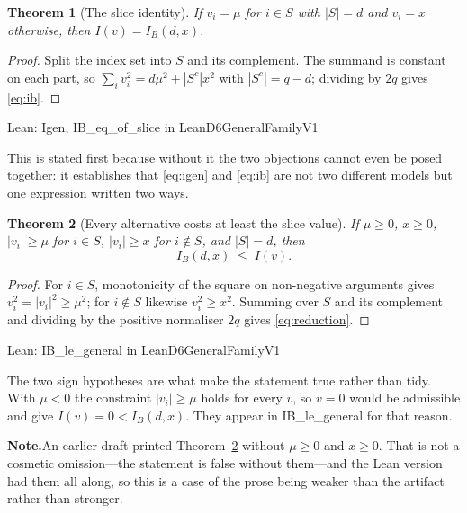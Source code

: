 \documentclass[conference]{IEEEtran}
\newtheorem{theorem}{Theorem}
\theoremstyle{definition}
\newcommand{\lean}[1]{\textsf{\footnotesize #1}}
\newcommand{\leanbox}[1]{%
  \par\vspace{2pt}\noindent
  {\footnotesize\textsf{Lean: #1}}\par\vspace{2pt}}
\newif\ifshownotes\shownotestrue
\newcommand{\NOTEPAR}[1]{\ifshownotes\par\vspace{2pt}\noindent%
  {\color{notecol}\textsf{\footnotesize\textbf{Note.}\;#1}}\par\vspace{2pt}\fi}
\begin{document}
\begin{theorem}[The slice identity]
\label{thm:slice}
If $v_{i}=\mu$ for $i\in S$ with $|S|=d$ and $v_{i}=x$ otherwise, then $I(v)=I_{B}(d,x)$.
\end{theorem}

\begin{proof}
Split the index set into $S$ and its complement. The summand is constant on each part, so
$\sum_{i}v_{i}^{2}=d\mu^{2}+|S^{c}|x^{2}$ with $|S^{c}|=q-d$; dividing by $2q$ gives
\eqref{eq:ib}.
\end{proof}

\leanbox{\lean{Igen}, \lean{IB\_eq\_of\_slice} in \lean{LeanD6GeneralFamilyV1}}

This is stated first because without it the two objections cannot even be posed together: it
establishes that \eqref{eq:igen} and \eqref{eq:ib} are not two different models but one
expression written two ways.

\begin{theorem}[Every alternative costs at least the slice value]
\label{thm:reduction}
If $\mu\ge0$, $x\ge0$, $|v_{i}|\ge\mu$ for $i\in S$, $|v_{i}|\ge x$ for $i\notin S$, and
$|S|=d$, then
\begin{equation}
I_{B}(d,x)\;\leq\;I(v).
\label{eq:reduction}
\end{equation}
\end{theorem}

\begin{proof}
For $i\in S$, monotonicity of the square on non-negative arguments gives
$v_{i}^{2}=|v_{i}|^{2}\ge\mu^{2}$; for $i\notin S$ likewise $v_{i}^{2}\ge x^{2}$. Summing over
$S$ and its complement and dividing by the positive normaliser $2q$ gives
\eqref{eq:reduction}.
\end{proof}

\leanbox{\lean{IB\_le\_general} in \lean{LeanD6GeneralFamilyV1}}

The two sign hypotheses are what make the statement true rather than tidy. With $\mu<0$ the
constraint $|v_{i}|\ge\mu$ holds for every $v$, so $v=0$ would be admissible and give
$I(v)=0<I_{B}(d,x)$. They appear in \lean{IB\_le\_general} for that reason.
\NOTEPAR{An earlier draft printed Theorem~\ref{thm:reduction} without $\mu\ge0$ and
$x\ge0$. That is not a cosmetic omission---the statement is false without them---and the Lean
version had them all along, so this is a case of the prose being weaker than the artifact
rather than stronger.}
\end{document}
